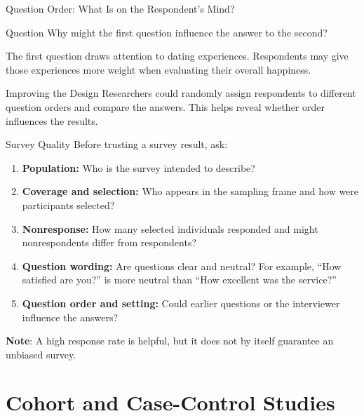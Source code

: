 \documentclass[aspectratio=169]{beamer}
\begin{document}
\begin{frame}{Question Order: What Is on the Respondent's Mind?}
\begin{block}{Question}
Why might the first question influence the answer to the second?
\end{block}

The first question draws attention to dating experiences. Respondents may give those experiences more weight when evaluating their overall happiness.

\begin{block}{Improving the Design}
Researchers could randomly assign respondents to different question orders and compare the answers. This helps reveal whether order influences the results.
\end{block}
\end{frame}

\begin{frame}{Survey Quality}
Before trusting a survey result, ask:

\begin{enumerate}
	\item \textbf{Population:} Who is the survey intended to describe?
	\item \textbf{Coverage and selection:} Who appears in the sampling frame and how were participants selected?
	\item \textbf{Nonresponse:} How many selected individuals responded and might nonrespondents differ from respondents?
	\item \textbf{Question wording:} Are questions clear and neutral? For example, ``How satisfied are you?'' is more neutral than ``How excellent was the service?''
	\item \textbf{Question order and setting:} Could earlier questions or the interviewer influence the answers?
\end{enumerate}

\textbf{Note}: A high response rate is helpful, but it does not by itself guarantee an unbiased survey.
\end{frame}

\section{Cohort and Case-Control Studies}
\end{document}
